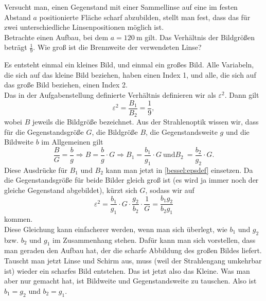 \begin{Exercise}[label = ipho20170402, title = Zwei Linsenpositionen , difficulty = 4, origin = 4. Runde IPhO 2017 ]
Versucht man, einen Gegenstand mit einer Sammellinse auf eine im festen Abstand $a$ positionierte Fläche scharf abzubilden, stellt man fest, dass das für zwei unterschiedliche Linsenpositionen möglich ist.\\
Betrachte einen Aufbau, bei dem $a= 120~\mathrm{m}$ gilt. Das Verhältnis der Bildgrößen beträgt $\frac{1}{9}$. Wie groß ist die Brennweite der verwendeten Linse? 
\end{Exercise}	
\begin{Answer}[ref = ipho20170402]
	Es entsteht einmal ein kleines Bild, und einmal ein großes Bild. Alle Variabeln, die sich auf das kleine Bild beziehen, haben einen Index 1, und alle, die sich auf das große Bild beziehen, einen Index 2.\\
	Das in der Aufgabenstellung definierte Verhältnis definieren wir als $\varepsilon^2$. Dann gilt
	\begin{equation}\label{bessel:epsdef}
		\varepsilon^2=\frac{B_1}{B_2} = \frac{1}{9},
	\end{equation}
	wobei $B$ jeweils die Bildgröße bezeichnet. Aus der Strahlenoptik wissen wir, dass für die Gegenstandsgröße $G$, die Bildgröße $B$, die Gegenstandsweite $g$ und die Bildweite $b$ im Allgemeinen gilt
	\begin{equation*}
		\frac{B}{G} = \frac{b}{g} \Rightarrow B = \frac{b}{g}\cdot G \Rightarrow B_1 = \frac{b_1}{g_1}\cdot G~\mathrm{und} B_2 ~= \frac{b_2}{g_2}\cdot G.
	\end{equation*}
	Diese Ausdrücke für $B_1$ und $B_2$ kann man jetzt in \eqref{bessel:epsdef} einsetzen. Da die Gegenstandsgröße für beide Bilder gleich groß ist (es wird ja immer noch der  gleiche Gegenstand abgebildet), kürzt sich $G$, sodass wir auf
	\begin{equation}\label{bessel:masss}
		\varepsilon^2 = \frac{b_1}{g_1}\cdot G \cdot \frac{g_2}{b_2}\cdot \frac{1}{G} = \frac{b_1 g_2}{b_2 g_1} 
	\end{equation}	
	kommen.\\
	Diese Gleichung kann einfacherer werden, wenn man sich überlegt, wie $b_1$ und $g_2$ bzw. $b_2$ und $g_1$ im Zusammenhang stehen. Dafür kann man sich vorstellen, dass man geraden den Aufbau hat, der die scharfe Abbildung des großen Bildes liefert. Tauscht man jetzt Linse und Schirm aus, muss (weil der Strahlengang umkehrbar ist) wieder ein scharfes Bild entstehen. Das ist jetzt also das Kleine. Was man aber nur gemacht hat, ist Bildweite und Gegenstandsweite zu tauschen. Also ist $b_1 = g_2$ und $b_2 = g_1$. \\

\end{Answer}
